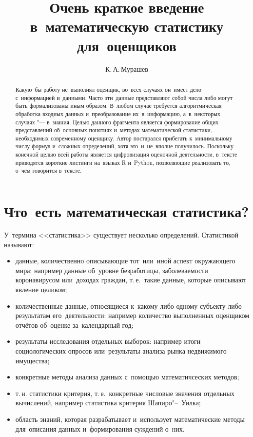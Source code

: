\documentclass[]{scrartcl}
\title{Очень краткое введение в~математическую статистику для~оценщиков}
\author{К.\,А.\,Мурашев}
\begin{document}
\maketitle

\begin{abstract}
	Какую~бы работу не~выполнял оценщик, во~всех случаях он~имеет дело с~информацией и~данными. Часто эти~данные представляют собой числа либо могут быть формализованы иным образом. В~любом случае требуется алгоритмическая обработка входных данных и~преобразование их~в~информацию, а~в~некоторых случаях "--- в~знания. Целью данного фрагмента является формирование общих представлений об~основных понятиях и~методах математической статистики, необходимых современному оценщику. Автор постарался прибегать к~минимальному числу формул и~сложных определений, хотя это~и~не~вполне получилось. Поскольку конечной целью всей работы является цифровизация оценочной деятельности, в~тексте приводятся короткие листинги на~языках R и~Python, позволяющие реализовать то, о~чём говорится в~тексте.
\end{abstract}

\section{Что~есть математическая статистика?}
У~термина <<статистика>> существует несколько определений. Статистикой называют:
	\begin{itemize}
		\item данные, количественно описывающие тот~или~иной аспект окружающего мира: например данные об~уровне безработицы, заболеваемости коронавирусом или~доходах граждан, т.\,е.~такие данные, которые описывают явление целиком;
		\item количественные данные, относящиеся к~какому-либо одному субъекту либо результатам его~деятельности: например количество выполненных оценщиком отчётов об~оценке за~календарный год;
		\item результаты исследования отдельных выборок: например итоги социологических опросов или~результаты анализа рынка недвижимого имущества;
		\item конкретные методы анализа данных с~помощью математичсеских методов;
		\item т.\,н. статистики критерия, т.\,е.~конкретные числовые значения отдельных вычислений, например статистика критерия Шапиро"--~Уилка;
		\item область знаний, которая разрабатывает и~использует математические методы для~описания данных и~формирования суждений о~них.		   
	\end{itemize}
\end{document}
